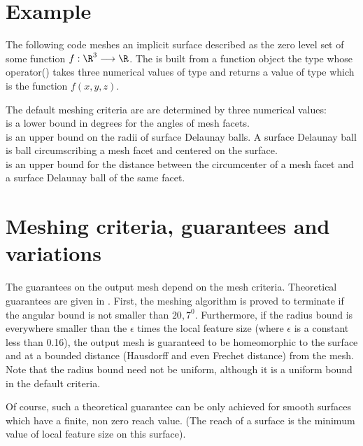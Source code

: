 \section{Example}
\label{SurfaceMesher_section_example}

The following code meshes an implicit surface described as the zero level
set of some function $f : \R^3 \longrightarrow \R$.
The   is built from 
a function object
the type  whose operator()
takes three numerical values  of type 
and returns a value of type  which is the function $f(x,y,z)$.

The default meshing criteria are  are determined  by three numerical
values: \\ 
 is a lower bound in degrees for the angles 
     of mesh facets.\\
 is an upper bound on the radii of surface Delaunay
balls. A surface Delaunay ball is ball circumscribing a mesh facet
and centered on the surface. \\
 is an upper bound for the distance 
between the circumcenter of a mesh facet and a surface
Delaunay ball of the same facet.


\section{Meshing criteria, guarantees and variations}
\label{SurfaceMesher_section_criteria}
\label{SurfaceMesher_section_variations}

The guarantees on the output mesh depend on the mesh criteria.
Theoretical guarantees are given in \cite{Oudot-and-co}.
First, the meshing algorithm is proved to terminate 
if the angular bound is
not smaller than $20,7^0$. 
Furthermore, if the radius bound is everywhere smaller than 
the $\epsilon$ times the local feature size  (where $\epsilon$ is a constant
less than 0.16),  the output mesh 
is guaranteed to be homeomorphic to the surface
and at a bounded distance (Hausdorff and even Frechet distance)
from the mesh.
Note that the radius bound need not be uniform,
although it is a uniform bound in the default criteria.

Of course, such a theoretical guarantee can be only achieved
for smooth surfaces which have a finite, non zero
reach value. (The reach of a surface is the minimum value of local feature size on
this surface).

